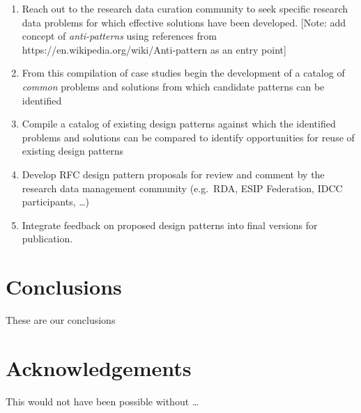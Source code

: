 \documentclass[paper]{ijdc-v9}
\providecommand{\tightlist}{%
  \setlength{\itemsep}{0pt}\setlength{\parskip}{0pt}}
\begin{document}
\begin{enumerate}
\def\labelenumi{\arabic{enumi}.}
\tightlist
\item
  Reach out to the research data curation community to seek specific
  research data problems for which effective solutions have been
  developed. {[}Note: add concept of \emph{anti-patterns} using
  references from https://en.wikipedia.org/wiki/Anti-pattern as an entry
  point{]}
\item
  From this compilation of case studies begin the development of a
  catalog of \emph{common} problems and solutions from which candidate
  patterns can be identified
\item
  Compile a catalog of existing design patterns against which the
  identified problems and solutions can be compared to identify
  opportunities for reuse of existing design patterns
\item
  Develop RFC design pattern proposals for review and comment by the
  research data management community (e.g.~RDA, ESIP Federation, IDCC
  participants, \ldots{})
\item
  Integrate feedback on proposed design patterns into final versions for
  publication.
\end{enumerate}

\section{Conclusions}\label{conclusions}

These are our conclusions

\section{Acknowledgements}\label{acknowledgements}

This would not have been possible without \ldots{}
\end{document}
